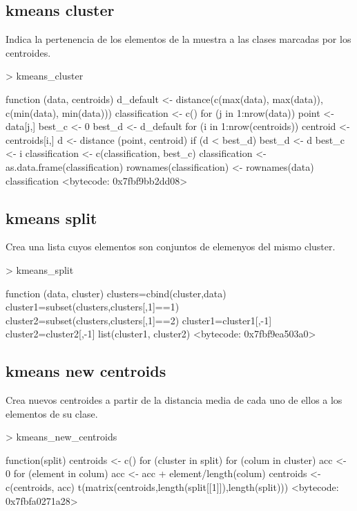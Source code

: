 \documentclass [a4paper] {article}
\begin{document}
\subsection{kmeans cluster}
Indica la pertenencia de los elementos de la muestra a las clases marcadas por los centroides.
\begin{Schunk}
\begin{Sinput}
> kmeans_cluster
\end{Sinput}
\begin{Soutput}
function (data, centroids) {
  d_default <- distance(c(max(data), max(data)), c(min(data), min(data)))
  classification <- c()
  for (j in 1:nrow(data)){
      point <- data[j,]
      best_c <- 0
      best_d <- d_default
      for (i in 1:nrow(centroids)){
        centroid <- centroids[i,]
        d <- distance (point, centroid)
        if (d < best_d){
          best_d <- d
          best_c <- i
        }
    }
    classification <- c(classification, best_c)
  }
  classification <- as.data.frame(classification)
  rownames(classification) <- rownames(data)
  classification
}
<bytecode: 0x7fbf9bb2dd08>
\end{Soutput}
\end{Schunk}
\subsection{kmeans split}
Crea una lista cuyos elementos son conjuntos de elemenyos del mismo cluster.
\begin{Schunk}
\begin{Sinput}
> kmeans_split
\end{Sinput}
\begin{Soutput}
function (data, cluster) {
  clusters=cbind(cluster,data)
  cluster1=subset(clusters,clusters[,1]==1)
  cluster2=subset(clusters,clusters[,1]==2)
  cluster1=cluster1[,-1]
  cluster2=cluster2[,-1]
  list(cluster1, cluster2)
}
<bytecode: 0x7fbf9ea503a0>
\end{Soutput}
\end{Schunk}
\subsection{kmeans new centroids}
Crea nuevos centroides a partir de la distancia media de cada uno de ellos a los elementos de su clase.
\begin{Schunk}
\begin{Sinput}
> kmeans_new_centroids
\end{Sinput}
\begin{Soutput}
function(split){
  centroids <- c()
  for (cluster in split) {
    for (colum in cluster) {
      acc <- 0
      for (element in colum){
        acc <- acc + element/length(colum)
      }
      centroids <- c(centroids, acc)
    }
  }
  t(matrix(centroids,length(split[[1]]),length(split)))
}
<bytecode: 0x7fbfa0271a28>
\end{Soutput}
\end{Schunk}
\end{document}
